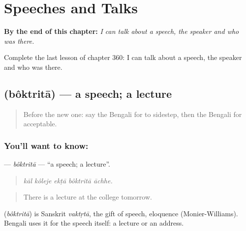 
\chapter{Speeches and Talks}
\label{ch:bn-speeches-and-talks}

\begin{chapteropening}
\textbf{By the end of this chapter:} \emph{I can talk about a speech, the speaker and who was there.}

Complete the last lesson of chapter 360: I can talk about a speech, the speaker and who was there.
\end{chapteropening}

\section[\texorpdfstring{\bn{বক্তৃতা} (bôktritā)}{বক্তৃতা (bôktritā)}]{ (bôktritā) — a speech; a lecture}

\label{lesson:BN-C360-boktrita}



\begin{quote}
Before the new one: say the Bengali for to sidestep, then the Bengali for acceptable.
\end{quote}

\subsection*{You'll want to know: }
\textbf{} — \emph{bôktritā} — \textquotedblleft{}a speech; a lecture\textquotedblright{}.

\begin{quote}
    
\end{quote}

\begin{quote}
\emph{kāl kôleje ekṭā bôktritā āchhe.}
\end{quote}

\begin{quote}
There is a lecture at the college tomorrow.
\end{quote}

\begin{cousinweb}
\textbf{} (\emph{bôktritā}) is Sanskrit \emph{vaktṛtā}, the gift of speech, eloquence (Monier-Williams). Bengali uses it for the speech itself: a lecture or an address.
\end{cousinweb}

